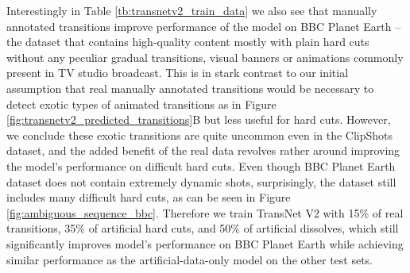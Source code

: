 Interestingly in Table \ref{tb:transnetv2_train_data} we also see that manually annotated transitions improve performance of the model on BBC Planet Earth -- the dataset that contains high-quality content mostly with plain hard cuts without any peculiar gradual transitions, visual banners or animations commonly present in TV studio broadcast. This is in stark contrast to our initial assumption that real manually annotated transitions would be necessary to detect exotic types of animated transitions as in Figure \ref{fig:transnetv2_predicted_transitions}B but less useful for hard cuts. However, we conclude these exotic transitions are quite uncommon even in the ClipShots dataset, and the added benefit of the real data revolves rather around improving the model's performance on difficult hard cuts.
Even though BBC Planet Earth dataset does not contain extremely dynamic shots, surprisingly, the dataset still includes many difficult hard cuts, as can be seen in Figure \ref{fig:ambiguous_sequence_bbc}. Therefore we train TransNet V2 with 15\% of real transitions, 35\% of artificial hard cuts, and 50\% of artificial dissolves, which still significantly improves model's performance on BBC Planet Earth while achieving similar performance as the artificial-data-only model on the other test sets.


